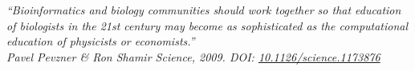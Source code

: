\null

\vspace*{0.50\textheight}

\begin{flushleft}
\itshape
“Bioinformatics and biology communities should work together so that education of biologists in the 21st century may become as sophisticated as the computational education of physicists or economists.”\\[1.0em]
\upshape
Pavel Pevzner \& Ron Shamir 
\textit{Science}, 2009. DOI: 
\href{https://doi.org/10.1126/science.1173876}{10.1126/science.1173876}
\end{flushleft}

\restoregeometry
\clearpage